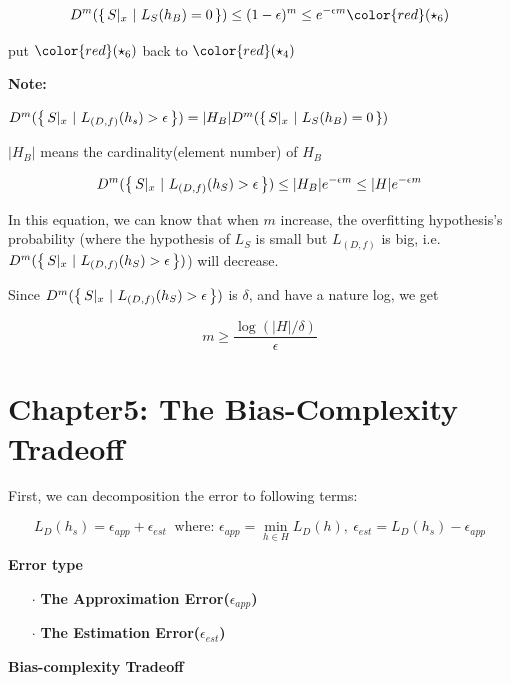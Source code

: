 $$D^m(\sett{S|_x~|~ L_S(h_B) = 0}) \leq (1 -\epsilon)^m \leq e^{-\epsilon m}\color{red}(\star_6)$$

put $\color{red}(\star_6)$ back to $\color{red}(\star_4)$ 

\begin{tcolorbox}
	\textbf{Note:}
	
	
	$D^m(\left\{ \,S|_x ~|~L_{(D,f)}(h_s)>\epsilon \,\right\}) = |H_B|D^m(\left\{ \,{S|_x ~|~L_S(h_B)=0} \,\right\})$
	
	$|H_B|$ means the cardinality(element number) of $H_B$
\end{tcolorbox}

$$D^m(\left\{ \,S|_x ~|~ L_{(D,f)}(h_S)>\epsilon \,\right\}) \leq |H_B|e^{-\epsilon m} \leq |H|e^{-\epsilon m}$$

\newpage

In this equation, we can know that when $m$ increase, the  overfitting hypothesis's probability (where the hypothesis of $L_S$ is small but $L_{(D,f)}$ is big, i.e. $D^m(\left\{ \,S|_x ~|~ L_{(D,f)}(h_S)>\epsilon \,\right\})$) will decrease.

Since $D^m(\left\{ \,S|_x ~|~ L_{(D,f)}(h_S)>\epsilon \,\right\})$ is $\delta$, and have a nature log, we get

$$m \geq \dfrac{\log(|H|/\delta)}{\epsilon}$$






\newpage


\section*{Chapter5: The Bias-Complexity Tradeoff}

First, we can decomposition the error to following terms:

$$L_D(h_s) = \epsilon_{app} + \epsilon_{est} ~\text{ where: } \epsilon_{app} = \min_{h \in H}L_D(h),~\epsilon_{est} = L_D(h_s) - \epsilon_{app}$$


\textbf{Error type}
\begin{enumerate}
	\item[$\cdot$] \textbf{The Approximation Error($\epsilon_{app}$)}
	\item[$\cdot$] \textbf{The Estimation Error($\epsilon_{est}$)}
\end{enumerate}

\textbf{Bias-complexity Tradeoff}












